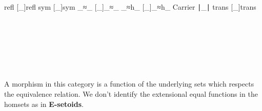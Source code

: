 {\begin{code}
\>[2]  \AgdaSymbol{=} \<%
\\
%
\\
\>    \AgdaSymbol{(}refl  [\_]refl\AgdaSymbol{;}
     sym  [\_]sym\AgdaSymbol{;} \_≈\_  [\_]\_≈\_ \AgdaSymbol{;} \_≈h\_  [\_]\_≈h\_ \AgdaSymbol{;}
     Carrier  ∣\_∣ \AgdaSymbol{;} trans  [\_]trans\AgdaSymbol{)}\<%
\\
%
\\
%
\\
\> \AgdaSymbol{:}  \AgdaSymbol{:} \AgdaSymbol{)\{}  \AgdaSymbol{:}   \AgdaSymbol{\}\{}  \AgdaSymbol{:} \AgdaFunction{[}  \AgdaFunction{]}   \AgdaSymbol{\}}    \<%
\\
\>\AgdaFunction{[}  \AgdaFunction{]uip} \AgdaSymbol{\{}\AgdaSymbol{\}} \AgdaSymbol{\{}\AgdaSymbol{\}} \AgdaSymbol{=}  \AgdaSymbol{(}\AgdaFunction{[}  \AgdaFunction{]}   \AgdaSymbol{)}\<%
\\
%
\\
%
\\
\>\<\end{code}
}

A morphism in this category is a function of the underlying sets which respects the equivalence relation. We don't identify the extensional equal functions in the homsets as in \textbf{E-setoids}.

